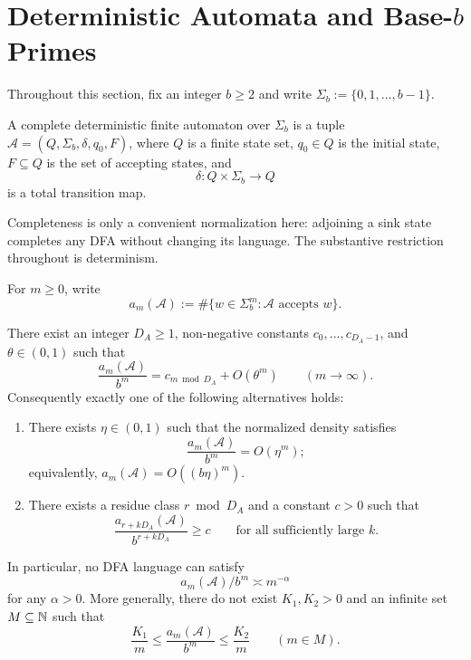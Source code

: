 \section{Deterministic Automata and Base-\texorpdfstring{$b$}{b} Primes}
\label{sec:automata}

Throughout this section, fix an integer \(b\ge 2\) and write
\(\Sigma_b:=\{0,1,\dots,b-1\}\).

\begin{definition}\label{def:dfa}
A complete deterministic finite automaton over \(\Sigma_b\) is a tuple
\(\mathcal A=(Q,\Sigma_b,\delta,q_0,F)\), where \(Q\) is a finite state
set, \(q_0\in Q\) is the initial state, \(F\subseteq Q\) is the set of
accepting states, and
\[
  \delta:Q\times\Sigma_b\to Q
\]
is a total transition map.
\end{definition}

Completeness is only a convenient normalization here: adjoining a sink
state completes any DFA without changing its language. The substantive
restriction throughout is determinism.

For \(m\ge 0\), write
\[
  a_m(\mathcal A)
  :=\#\{w\in\Sigma_b^m:\mathcal A\text{ accepts }w\}.
\]

\begin{theorem}
  \label{thm:dfa-density-dichotomy}
  There exist an integer \(D_A\ge 1\), non-negative constants
  \(c_0,\dots,c_{D_A-1}\), and \(\theta\in(0,1)\) such that
  \[
    \frac{a_m(\mathcal A)}{b^m}=c_{m\bmod D_A}+O(\theta^m)
    \qquad (m\to\infty).
  \]
  Consequently exactly one of the following alternatives holds:
  \begin{enumerate}[label=\textup{(\roman*)}]
    \item There exists \(\eta\in(0,1)\) such that the normalized
    density satisfies
    \[
      \frac{a_m(\mathcal A)}{b^m}=O(\eta^m);
    \]
    equivalently, \(a_m(\mathcal A)=O((b\eta)^m)\).
    \item There exists a residue class \(r\bmod D_A\) and a constant
    \(c>0\) such that
    \[
      \frac{a_{r+kD_A}(\mathcal A)}{b^{r+kD_A}}\ge c
      \qquad\text{for all sufficiently large }k.
    \]
  \end{enumerate}
  In particular, no DFA language can satisfy
  \[
    a_m(\mathcal A)/b^m\asymp m^{-\alpha}
  \]
  for any \(\alpha>0\). More generally, there do not exist
  \(K_1,K_2>0\) and an infinite set \(M\subseteq\mathbb{N}\) such that
  \[
    \frac{K_1}{m}\le \frac{a_m(\mathcal A)}{b^m}\le \frac{K_2}{m}
    \qquad(m\in M).
  \]
\end{theorem}

